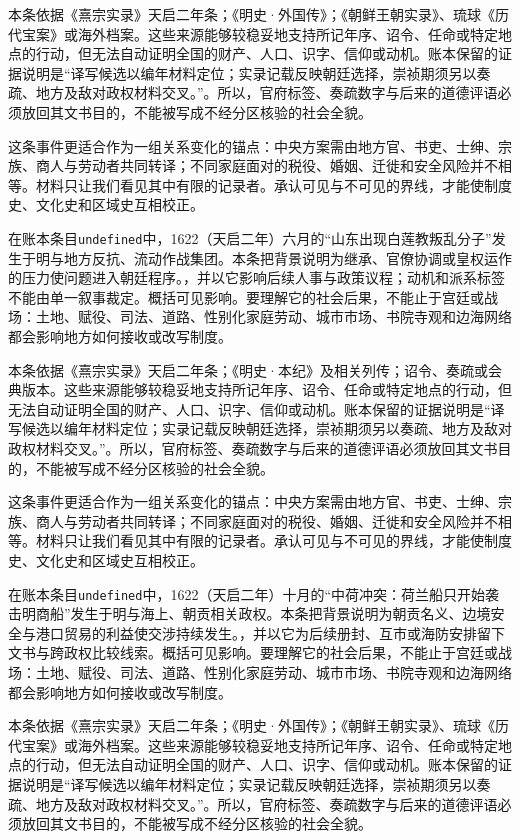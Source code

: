本条依据《熹宗实录》天启二年条；《明史·外国传》；《朝鲜王朝实录》、琉球《历代宝案》或海外档案。这些来源能够较稳妥地支持所记年序、诏令、任命或特定地点的行动，但无法自动证明全国的财产、人口、识字、信仰或动机。账本保留的证据说明是“译写候选以编年材料定位；实录记载反映朝廷选择，崇祯期须另以奏疏、地方及敌对政权材料交叉。”。所以，官府标签、奏疏数字与后来的道德评语必须放回其文书目的，不能被写成不经分区核验的社会全貌。

这条事件更适合作为一组关系变化的锚点：中央方案需由地方官、书吏、士绅、宗族、商人与劳动者共同转译；不同家庭面对的税役、婚姻、迁徙和安全风险并不相等。材料只让我们看见其中有限的记录者。承认可见与不可见的界线，才能使制度史、文化史和区域史互相校正。

在账本条目\texttt{undefined}中，1622（天启二年）六月的“山东出现白莲教叛乱分子”发生于明与地方反抗、流动作战集团。本条把背景说明为继承、官僚协调或皇权运作的压力使问题进入朝廷程序。，并以它影响后续人事与政策议程；动机和派系标签不能由单一叙事裁定。概括可见影响。要理解它的社会后果，不能止于宫廷或战场：土地、赋役、司法、道路、性别化家庭劳动、城市市场、书院寺观和边海网络都会影响地方如何接收或改写制度。

本条依据《熹宗实录》天启二年条；《明史·本纪》及相关列传；诏令、奏疏或会典版本。这些来源能够较稳妥地支持所记年序、诏令、任命或特定地点的行动，但无法自动证明全国的财产、人口、识字、信仰或动机。账本保留的证据说明是“译写候选以编年材料定位；实录记载反映朝廷选择，崇祯期须另以奏疏、地方及敌对政权材料交叉。”。所以，官府标签、奏疏数字与后来的道德评语必须放回其文书目的，不能被写成不经分区核验的社会全貌。

这条事件更适合作为一组关系变化的锚点：中央方案需由地方官、书吏、士绅、宗族、商人与劳动者共同转译；不同家庭面对的税役、婚姻、迁徙和安全风险并不相等。材料只让我们看见其中有限的记录者。承认可见与不可见的界线，才能使制度史、文化史和区域史互相校正。

在账本条目\texttt{undefined}中，1622（天启二年）十月的“中荷冲突：荷兰船只开始袭击明商船”发生于明与海上、朝贡相关政权。本条把背景说明为朝贡名义、边境安全与港口贸易的利益使交涉持续发生。，并以它为后续册封、互市或海防安排留下文书与跨政权比较线索。概括可见影响。要理解它的社会后果，不能止于宫廷或战场：土地、赋役、司法、道路、性别化家庭劳动、城市市场、书院寺观和边海网络都会影响地方如何接收或改写制度。

本条依据《熹宗实录》天启二年条；《明史·外国传》；《朝鲜王朝实录》、琉球《历代宝案》或海外档案。这些来源能够较稳妥地支持所记年序、诏令、任命或特定地点的行动，但无法自动证明全国的财产、人口、识字、信仰或动机。账本保留的证据说明是“译写候选以编年材料定位；实录记载反映朝廷选择，崇祯期须另以奏疏、地方及敌对政权材料交叉。”。所以，官府标签、奏疏数字与后来的道德评语必须放回其文书目的，不能被写成不经分区核验的社会全貌。

